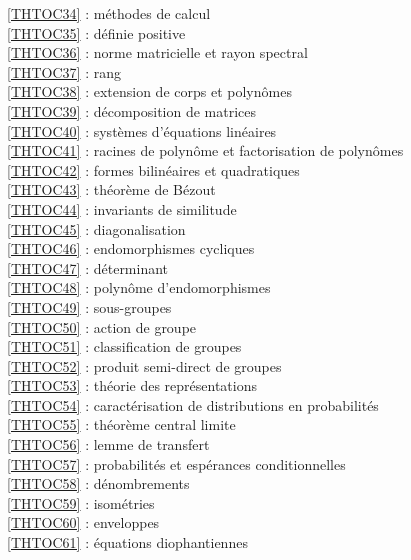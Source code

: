\ref {THTOC34} : méthodes de calcul\\
\ref {THTOC35} : définie positive\\
\ref {THTOC36} : norme matricielle et rayon spectral\\
\ref {THTOC37} : rang\\
\ref {THTOC38} : extension de corps et polynômes\\
\ref {THTOC39} : décomposition de matrices\\
\ref {THTOC40} : systèmes d'équations linéaires\\
\ref {THTOC41} : racines de polynôme et factorisation de polynômes\\
\ref {THTOC42} : formes bilinéaires et quadratiques\\
\ref {THTOC43} : théorème de Bézout\\
\ref {THTOC44} : invariants de similitude\\
\ref {THTOC45} : diagonalisation\\
\ref {THTOC46} : endomorphismes cycliques\\
\ref {THTOC47} : déterminant\\
\ref {THTOC48} : polynôme d'endomorphismes\\
\ref {THTOC49} : sous-groupes\\
\ref {THTOC50} : action de groupe\\
\ref {THTOC51} : classification de groupes\\
\ref {THTOC52} : produit semi-direct de groupes\\
\ref {THTOC53} : théorie des représentations\\
\ref {THTOC54} : caractérisation de distributions en probabilités\\
\ref {THTOC55} : théorème central limite\\
\ref {THTOC56} : lemme de transfert\\
\ref {THTOC57} : probabilités et espérances conditionnelles\\
\ref {THTOC58} : dénombrements\\
\ref {THTOC59} : isométries\\
\ref {THTOC60} : enveloppes\\
\ref {THTOC61} : équations diophantiennes\\
